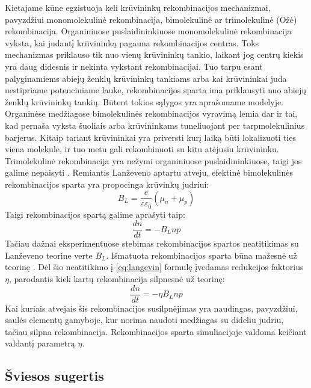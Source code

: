 Kietajame kūne egzistuoja keli krūvininkų rekombinacijos mechanizmai, pavyzdžiui monomolekulinė rekombinacija, bimolekulinė ar trimolekulinė (Ožė) rekombinacija. Organiniuose puslaidininkiuose monomolekulinė rekombinacija vyksta, kai judantį krūvininką pagauna rekombinacijos centras. Toks mechanizmas priklauso tik nuo vienų krūvininkų tankio, laikant jog centrų kiekis yra daug didesnis ir nekinta vykstant rekombinacijai. Tuo tarpu esant palyginamiems abiejų ženklų krūvininkų tankiams arba kai krūvininkai juda nestipriame potenciniame lauke, rekombinacijos sparta ima priklausyti nuo abiejų ženklų krūvininkų tankių. Būtent tokios sąlygos yra aprašomame modelyje. Organinėse medžiagose bimolekulinės rekombinacijos vyravimą lemia dar ir tai, kad pernaša vyksta šuoliais arba krūvininkams tuneliuojant per tarpmolekulinius barjerus. Kitaip tariant krūvininkai yra priversti kurį laiką būti lokalizuoti ties viena molekule, ir tuo metu gali rekombinuoti su kitu atėjusiu krūvininku. Trimolekulinė rekombinacija yra nežymi organiniuose puslaidininkiuose, taigi jos galime nepaisyti \cite{juška:143303,juška:013303}.
Remiantis Lanževeno \cite{langevin} aptartu atveju, efektinė bimolekulinės rekombinacijos sparta yra propocinga krūvinkų judriui:
\begin{equation}
B_L=\frac{e}{\varepsilon \varepsilon_0}(\mu_n+\mu_p)
\end{equation}
Taigi rekombinacijos spartą galime aprašyti taip:
\begin{equation} \label{eq:langevin}
\frac{dn}{dt}=-B_L n p
\end{equation}
Tačiau dažnai eksperimentuose stebimas rekombinacijos spartos neatitikimas su Lanževeno teorine verte \(B_L\). Išmatuota rekombinacijos sparta būna mažesnė už teorinę \cite{juška:155202}. Dėl šio neatitikimo į \eqref{eq:langevin} formulę įvedamas redukcijos faktorius \(\eta\), parodantis kiek kartų rekombinacija silpnesnė už teorinę:
\begin{equation}
	\frac{dn}{dt}=-\eta B_L n p
\end{equation}
Kai kuriais atvejais šis rekombinacijos susilpnėjimas yra naudingas, pavyzdžiui, saulės elementų gamyboje, kur norima naudoti medžiagas su dideliu judriu, tačiau silpna rekombinacija.
Rekombinacijos sparta simuliacijoje valdoma keičiant valdantį parametrą \(\eta\).

\subsection{Šviesos sugertis}

